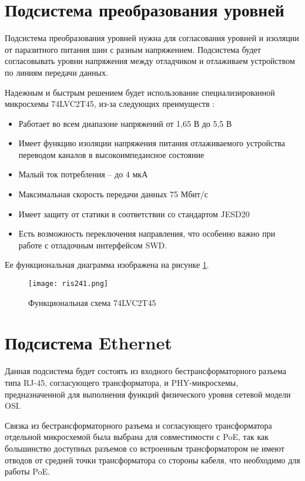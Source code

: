 \section{Подсистема преобразования уровней}
\hspace{1cm}

Подсистема преобразования уровней нужна для согласования уровней и изоляции от паразитного 
питания шин с разным напряжением. Подсистема будет согласовывать уровни напряжения между
отладчиком и отлаживаем устройством по линиям передачи данных. 

Надежным и быстрым решением будет использование специализированной микросхемы 74LVC2T45, из-за
следующих преимуществ \cite{SN74LVC2T45:datasheet}:
\begin{itemize}
  \item Работает во всем диапазоне напряжений от 1,65 В до 5,5 В
  \item Имеет функцию изоляции напряжения питания отлаживаемого устройства переводом каналов в
  высокоимпедансное состояние
  \item Малый ток потребления -- до 4 мкА
  \item Максимальная скорость передачи данных 75 Мбит/с
  \item Имеет защиту от статики в соответствии со стандартом JESD20
  \item Есть возможность переключения направления, что особенно важно при работе с отладочным 
  интерфейсом SWD.
\end{itemize}
 Ее функциональная диаграмма изображена на рисунке \ref{ris:241}.

\begin{figure}[H]
  \centering
  \texttt{[image: ris241.png]}
  \caption{Функциональная схема 74LVC2T45}
  \label{ris:241}
\end{figure}


\section{Подсистема Ethernet}
\hspace{1cm}

Данная подсистема будет состоять из входного бестрансформаторного разъема типа RJ-45, 
согласующего трансформатора, и PHY-микросхемы, предназначенной для выполнения функций 
физического уровня сетевой модели OSI.

Связка из бестрансформаторного разъема и согласующего трансформатора отдельной
микросхемой была выбрана для совместимости с PoE, так как большинство доступных разъемов со 
встроенным трансформатором не имеют отводов от средней точки трансформатора со стороны кабеля,
что необходимо для работы PoE. 

